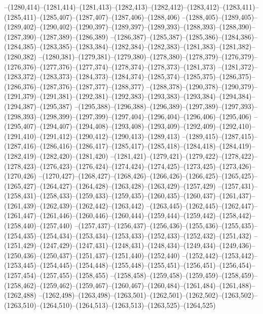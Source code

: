 --(1280,414)--(1281,414)--(1281,413)--(1282,413)--(1282,412)--(1283,412)--(1283,411)--(1285,411)--(1285,407)--(1287,407)--(1287,406)--(1288,406)
--(1288,405)--(1289,405)--(1289,402)--(1290,402)--(1290,397)--(1289,397)--(1289,393)--(1288,393)--(1288,390)--(1287,390)--(1287,389)--(1286,389)
--(1286,387)--(1285,387)--(1285,386)--(1284,386)--(1284,385)--(1283,385)--(1283,384)--(1282,384)--(1282,383)--(1281,383)--(1281,382)--(1280,382)
--(1280,381)--(1279,381)--(1279,380)--(1278,380)--(1278,379)--(1276,379)--(1276,376)--(1277,376)--(1277,374)--(1278,374)--(1278,373)--(1281,373)
--(1281,372)--(1283,372)--(1283,373)--(1284,373)--(1284,374)--(1285,374)--(1285,375)--(1286,375)--(1286,376)--(1287,376)--(1287,377)--(1288,377)
--(1288,378)--(1290,378)--(1290,379)--(1291,379)--(1291,381)--(1292,381)--(1292,383)--(1293,383)--(1293,384)--(1294,384)--(1294,387)--(1295,387)
--(1295,388)--(1296,388)--(1296,389)--(1297,389)--(1297,393)--(1298,393)--(1298,399)--(1297,399)--(1297,404)--(1296,404)--(1296,406)--(1295,406)
--(1295,407)--(1294,407)--(1294,408)--(1293,408)--(1293,409)--(1292,409)--(1292,410)--(1291,410)--(1291,412)--(1290,412)--(1290,413)--(1289,413)
--(1289,415)--(1287,415)--(1287,416)--(1286,416)--(1286,417)--(1285,417)--(1285,418)--(1284,418)--(1284,419)--(1282,419)--(1282,420)--(1281,420)
--(1281,421)--(1279,421)--(1279,422)--(1278,422)--(1278,423)--(1276,423)--(1276,424)--(1274,424)--(1274,425)--(1273,425)--(1273,426)--(1270,426)
--(1270,427)--(1268,427)--(1268,426)--(1266,426)--(1266,425)--(1265,425)--(1265,427)--(1264,427)--(1264,428)--(1263,428)--(1263,429)--(1257,429)
--(1257,431)--(1258,431)--(1258,433)--(1259,433)--(1259,435)--(1260,435)--(1260,437)--(1261,437)--(1261,439)--(1262,439)--(1262,442)--(1263,442)
--(1263,445)--(1262,445)--(1262,447)--(1261,447)--(1261,446)--(1260,446)--(1260,444)--(1259,444)--(1259,442)--(1258,442)--(1258,440)--(1257,440)
--(1257,437)--(1256,437)--(1256,436)--(1255,436)--(1255,435)--(1254,435)--(1254,434)--(1253,434)--(1253,433)--(1252,433)--(1252,432)--(1251,432)
--(1251,429)--(1247,429)--(1247,431)--(1248,431)--(1248,434)--(1249,434)--(1249,436)--(1250,436)--(1250,437)--(1251,437)--(1251,440)--(1252,440)
--(1252,442)--(1253,442)--(1253,445)--(1254,445)--(1254,448)--(1255,448)--(1255,451)--(1256,451)--(1256,454)--(1257,454)--(1257,455)--(1258,455)
--(1258,458)--(1259,458)--(1259,459)--(1258,459)--(1258,462)--(1259,462)--(1259,467)--(1260,467)--(1260,484)--(1261,484)--(1261,488)--(1262,488)
--(1262,498)--(1263,498)--(1263,501)--(1262,501)--(1262,502)--(1263,502)--(1263,510)--(1264,510)--(1264,513)--(1263,513)--(1263,525)--(1264,525)
